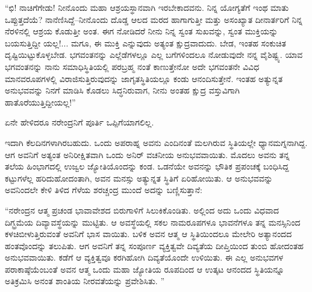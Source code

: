 “ಛಿ! ನಾಚಿಗೆಗೇಡು! ನೀನೊಂದು ಮಹಾ ಆಶ್ರಯಸ್ಥಾನವಾಗಿ ಇರಬೇಕಾದವನು. ನಿನ್ನ ಯೋಗ್ಯತೆಗೆ ಇಂಥ ಮಾತು ಒಪ್ಪುತ್ತದೆಯೆ? ನಾನೆಣಿಸಿದ್ದೆ–ನೀನೊಂದು ದೊಡ್ಡ ಆಲದ ಮರದ ಹಾಗಾಗುತ್ತೀ ಮತ್ತು ಅಸಂಖ್ಯಾತ ದೀನಾರ್ತರಿಗೆ ನಿನ್ನ ನೆರಳಿನಲ್ಲಿ ಆಶ್ರಯ ಕೊಡುತ್ತೀ ಅಂತ. ಈಗ ನೋಡಿದರೆ ನೀನು ನಿನ್ನ ಸ್ವಂತ ಸುಖವನ್ನು, ಸ್ವಂತ ಮುಕ್ತಿಯನ್ನು ಬಯಸುತ್ತಿದ್ದೀ ಯಲ್ಲ!... ಮಗೂ, ಈ ಮುಕ್ತಿ ಎನ್ನುವುದು ಅತ್ಯಂತ ಕ್ಷುದ್ರವಾದುದು. ಬೇಡ, ಇಂತಹ ಸಂಕುಚಿತ ದೃಷ್ಟಿಯಿಟ್ಟುಕೊಳ್ಳಬೇಡ. ಭಗವಂತನನ್ನು ಎಲ್ಲೆಡೆಗಳಲ್ಲೂ ಎಲ್ಲ ಬಗೆಗಳಿಂದಲೂ ನೋಡುವುದೇ ನನ್ನ ವೈಶಿಷ್ಟ್ಯ. ಯಾವ ಭಗವಂತನನ್ನು ನಾನು ಸಮಾಧಿಸ್ಥಿತಿಯಲ್ಲಿ ಪರಬ್ರಹ್ಮ ನಂತೆ ಕಾಣುತ್ತೇನೋ ಅದೇ ಭಗವಂತನೇ ವಿವಿಧ ಮಾನವರೂಪಗಳಲ್ಲಿ ವಿರಾಜಿಸುತ್ತಿರುವುದನ್ನು ಜಾಗೃತಸ್ಥಿತಿಯಲ್ಲೂ ಕಂಡು ಆನಂದಿಸುತ್ತೇನೆ. ಇಂತಹ ಅತ್ಯುನ್ನತ ಅನುಭವವನ್ನು ನಿನಗೆ ಮಾಡಿಸಿ ಕೊಡಲು ಸಿದ್ಧನಿರುವಾಗ, ನೀನು ಅಂತಹ ಕ್ಷುದ್ರ ವಸ್ತುವಿಗಾಗಿ ಹಾತೊರೆಯುತ್ತಿದ್ದೀಯಲ್ಲ!”

ಏನೇ ಹೇಳಿದರೂ ನರೇಂದ್ರನಿಗೆ ಪೂರ್ತಿ ಒಪ್ಪಿಗೆಯಾಗಲಿಲ್ಲ.

ಇದಾಗಿ ಕೆಲದಿನಗಳಾಗಿರಬಹುದು. ಒಂದು ಅಪರಾಹ್ನ ಅವನು ಎಂದಿನಂತೆ ಮಲಗಿರುವ ಸ್ಥಿತಿಯಲ್ಲೇ ಧ್ಯಾನಮಗ್ನನಾಗಿದ್ದ. ಆಗ ಅವನಿಗೆ ಅತ್ಯಂತ ಅನಿರೀಕ್ಷಿತವಾಗಿ ಒಂದು ಅನಿರ್ ವಚನೀಯ ಅನುಭವವಾಯಿತು. ಮೊದಲು ಅವನು ತನ್ನ ತಲೆಯ ಹಿಂಭಾಗದಲ್ಲಿ ಉಜ್ವಲ ಜ್ಯೋತಿಯೊಂದನ್ನು ಕಂಡ. ಒಡನೆಯೇ ಅವನನ್ನು ಭೌತಿಕ ಪ್ರಪಂಚಕ್ಕೆ ಬಂಧಿಸಿದ್ದ ಕಟ್ಟುಗಳೆಲ್ಲ ಹರಿದುಹೋದಂತಾಗಿ, ಅವನ ಮನಸ್ಸು ಅತ್ಯುನ್ನತ ಸ್ಥಿತಿಗೆ ಏರಿಹೋಯಿತು. ಆ ಅನುಭವವನ್ನು ಅವನಿಂದಲೇ ಕೇಳಿ ತಿಳಿದ ಗೆಳೆಯ ಶರಚ್ಚಂದ್ರ ಮುಂದೆ ಅದನ್ನು ಬಣ್ಣಿಸುತ್ತಾನೆ:

“ನರೇಂದ್ರನ ಆತ್ಮ ಪ್ರಚಂಡ ಭಾವಾವೇಶದ ಬಿರುಗಾಳಿಗೆ ಸಿಲುಕಿಕೊಂಡಿತು. ಅಲ್ಲಿಂದ ಅದು ಒಂದು ವಿಧವಾದ ದಿಗ್ಭ್ರಮೆಯ ದಿವ್ಯಾವಸ್ಥೆಯನ್ನು ಮುಟ್ಟಿತು. ಆ ಅವಸ್ಥೆಯಲ್ಲಿ ಸಕಲ ನಾಮರೂಪಗಳೂ ಭಾವನೆಗಳೂ ತನ್ನ ಮನಸ್ಸಿನಿಂದ ಕಳಚಿಬೀಳುತ್ತಿರುವಂತೆ ಅವನಿಗೆ ಭಾಸ ವಾಯಿತು. ಬಳಿಕ ಅವನ ಆತ್ಮ ಆ ಸ್ಥಿತಿಯಿಂದಲೂ ಮೇಲೇರಿ ಅತ್ಯಾನಂದದ ಹಂತವೊಂದನ್ನು ತಲುಪಿತು. ಆಗ ಅವನಿಗೆ ತನ್ನ ಸಂಪೂರ್ಣ ವ್ಯಕ್ತಿತ್ವವೇ ದಿವ್ಯತೆಯ ದೀಪ್ತಿಯಿಂದ ತುಂಬಿ ಹೋದಂತಹ ಅನುಭವವಾಯಿತು. ಕಡೆಗೆ ಆ ವ್ಯಕ್ತಿತ್ವವೂ ಕರಗಿಹೋಗಿ ದಿವ್ಯತೆಯೊಂದೇ ಉಳಿಯಿತು. ಈ ಎಲ್ಲ ಅನುಭವಗಳ ಪರಾಕಾಷ್ಠೆಯೆಂಬಂತೆ ಅವನ ಆತ್ಮ ಒಂದು ಮಹಾ ಜ್ಯೋತಿಯ ರೂಪದಿಂದ ಆ ಉತ್ಕಟ ಆನಂದದ ಸ್ಥಿತಿಯನ್ನೂ ಅತಿಕ್ರಮಿಸಿ ಅನಂತ ಶಾಂತಿಯ ನೀರವತೆಯನ್ನು ಪ್ರವೇಶಿಸಿತು. ”

